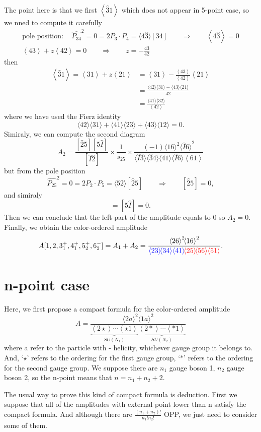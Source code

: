 \documentclass[12pt]{article}
\newcommand{\mdavg}[2]{\langle #1 \rangle\!\langle #2 \rangle}
\newcommand{\avg}[1]{\left\langle #1 \right\rangle}
\newcommand{\inavg}[2]{\langle #1 \rangle\! [#2]}
\newcommand{\asqu}[1]{{\langle#1\rangle}^2}
\begin{document}
The point here is that we first $\avg{\hat{3}1}$ which does not appear in 5-point case, so we nned to compute it carefully
\begin{gather*}
    \text{pole position}: \quad \hat{P_{34}}^2=0=2P_3\cdot P_4=\inavg{4\hat{3}}{34}\qquad\Rightarrow \qquad \avg{4\hat{3}}=0\\
    \avg{43}+z\avg{42}=0\qquad \Rightarrow \qquad z=-\frac{43}{42}
\end{gather*}
then
\begin{align*}
    \avg{\hat{3}1}=\avg{31}+z\avg{21}&=\avg{31}-\frac{\avg{43}}{\avg{42}}\avg{21}\\
    &=\frac{\mdavg{42}{31}-\mdavg{43}{21}}{42}\\
    &=\frac{\mdavg{41}{32}}{\avg{42}}
\end{align*}
where we have used the Fierz identity
\begin{equation*}
    \mdavg{42}{31}+\mdavg{41}{23}+\mdavg{43}{12}=0.
\end{equation*}
Simiraly, we can compute the second diagram
\begin{equation*}
    A_2=\frac{[\hat{2}5][5\hat{I}]}{[\hat{I}\hat{2}]}\times\frac{1}{s_{25}}\times \frac{(-1)\asqu{16}\asqu{\hat{I}6}}{\mdavg{\hat{I}\hat{3}}{\hat{3}4}
    \!\mdavg{41}{\hat{I}6}\!\avg{61}}
\end{equation*}
but from the pole position
\begin{equation*}
    \hat{P_{25}}^2=0=2P_2\cdot P_5=\inavg{52}{\hat{2}5}\qquad\Rightarrow \qquad [\hat{2}5]=0,
\end{equation*}
and simiraly
\begin{equation*}
    [\hat{2}\hat{I}]=[5\hat{I}]=0.
\end{equation*}
Then we can conclude that the left part of the amplitude equals to 0 so $A_2=0$. Finally, we obtain the color-ordered amplitude 
\begin{equation*}
    A[1,2,3_1^+,4_1^+,5_2^+,6_2^-]=A_1+A_2=\frac{\asqu{26}\!\asqu{16}}{\textcolor{blue}{\mdavg{23}{34}\!\avg{41}}\!\textcolor{red}{\mdavg{25}{56}\!\avg{51}}}.
\end{equation*}
\section{n-point case}
Here, we first propose a compact formula for the color-ordered amplitude
\begin{equation*}
    A=\frac{\asqu{2a}\!\asqu{1a}}{\underbrace{\avg{2\star}\cdots \avg{\star 1}}_{SU(N_1)}\underbrace{\avg{2\ast }\cdots \avg{\ast 1}}_{SU(N_2)}}
\end{equation*}
where a refer to the particle with - helicity, whichever gauge group it belongs to. And, `$\star$' refers to the ordering for the first gauge group, `$\ast$'
refers to the ordering for the second gauge group. We suppose there are $n_1$ gauge boson 1, $n_2$ gauge boson 2, so the n-point means that $n=n_1+n_2+2$.
\par
The usual way to prove this kind of compact formula is deduction. First we suppose that all of the amplitudes with external point lower than n satisfy the compact formula.
And although there are $\frac{(n_1+n_2)!}{n_1!n_2!}$ OPP, we just need to consider some of them. 
\end{document}

